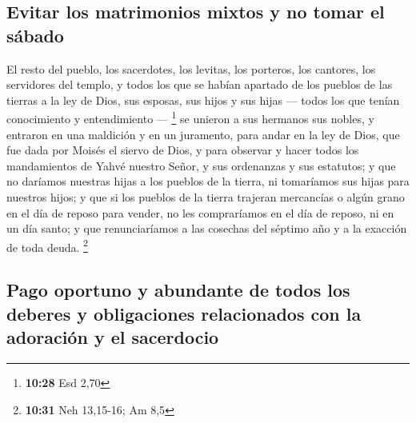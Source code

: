 \hypertarget{evitar-los-matrimonios-mixtos-y-no-tomar-el-suxe1bado}{%
\subsection{Evitar los matrimonios mixtos y no tomar el
sábado}\label{evitar-los-matrimonios-mixtos-y-no-tomar-el-suxe1bado}}

 El resto del pueblo, los sacerdotes, los levitas, los
porteros, los cantores, los servidores del templo, y todos los que se
habían apartado de los pueblos de las tierras a la ley de Dios, sus
esposas, sus hijos y sus hijas --- todos los que tenían conocimiento y
entendimiento --- \footnote{\textbf{10:28} Esd 2,70}  se
unieron a sus hermanos sus nobles, y entraron en una maldición y en un
juramento, para andar en la ley de Dios, que fue dada por Moisés el
siervo de Dios, y para observar y hacer todos los mandamientos de Yahvé
nuestro Señor, y sus ordenanzas y sus estatutos;  y que
no daríamos nuestras hijas a los pueblos de la tierra, ni tomaríamos sus
hijas para nuestros hijos;  y que si los pueblos de la
tierra trajeran mercancías o algún grano en el día de reposo para
vender, no les compraríamos en el día de reposo, ni en un día santo; y
que renunciaríamos a las cosechas del séptimo año y a la exacción de
toda deuda. \footnote{\textbf{10:31} Neh 13,15-16; Am 8,5}

\hypertarget{pago-oportuno-y-abundante-de-todos-los-deberes-y-obligaciones-relacionados-con-la-adoraciuxf3n-y-el-sacerdocio}{%
\subsection{Pago oportuno y abundante de todos los deberes y
obligaciones relacionados con la adoración y el
sacerdocio}\label{pago-oportuno-y-abundante-de-todos-los-deberes-y-obligaciones-relacionados-con-la-adoraciuxf3n-y-el-sacerdocio}}

